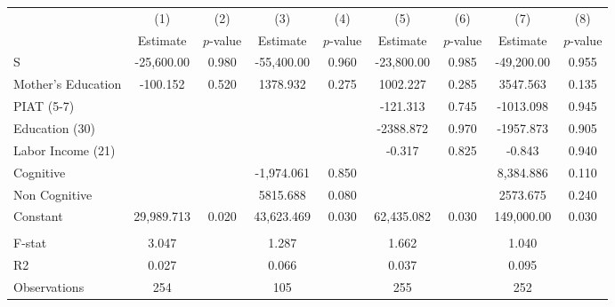 \begin{tabular}{lcccccccc} \toprule
 & (1) & (2) & (3) & (4) & (5) & (6) & (7) & (8) \\ 
 & Estimate  & $p$-value  & Estimate  & $p$-value  & Estimate  & $p$-value  & Estimate  & $p$-value  \\  \midrule
S & -25,600.00 &     0.980 & -55,400.00 &     0.960 & -23,800.00 &     0.985 & -49,200.00 &     0.955 \\  
Mother's Education &  -100.152 &     0.520 &  1378.932 &     0.275 &  1002.227 &     0.285 &  3547.563 &     0.135 \\  
PIAT (5-7) &         &         &         &         &  -121.313 &     0.745 & -1013.098 &     0.945 \\  
Education (30) &         &         &         &         & -2388.872 &     0.970 & -1957.873 &     0.905 \\  
Labor Income (21) &         &         &         &         &    -0.317 &     0.825 &    -0.843 &     0.940 \\  
Cognitive &         &         & -1,974.061 &     0.850 &         &         &  8,384.886 &     0.110 \\  
Non Cognitive &         &         &  5815.688 &     0.080 &         &         &  2573.675 &     0.240 \\  
Constant & 29,989.713 &     0.020 & 43,623.469 &     0.030 & 62,435.082 &     0.030 &  149,000.00 &     0.030 \\  \\ \midrule
F-stat &     3.047 &         &     1.287 &         &     1.662 &         &     1.040 &         \\ 
R2 &     0.027 &         &     0.066 &         &     0.037 &         &     0.095 &         \\ 
Observations &   254 &         &   105  &         &   255  &         &   252  &         \\ 
\bottomrule \end{tabular}
